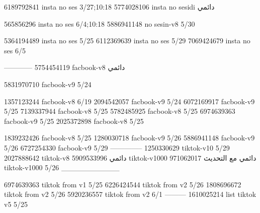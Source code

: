 
6189792841 insta no ses
3/27;10:18
5774028106 insta no sesidi
دائمي


565856296 insta no ses
6/4;10:18
5886941148 no sesin-v8
5/30

5364194489 insta no ses
5/25
6112369639 insta no ses
5/29
7069424679 insta no ses
6/5

------------
5754454119 facbook-v8
دائمي

5831970710 facbook-v9
5/24

1357123244 facbook-v8
6/19
2094542057 facbook-v9
5/24
6072169917 facbook-v9
5/25
7139337944 facbook-v8
5/25
5782485925 facbook-v8
5/25
6974639363 facbook-v9
5/25
2025372898 facbook-v8
5/25

1839232426 facbook-v8
5/25
1280030718 facbook-v9
5/26
5886941148 facbook-v9
5/26
6727254330 facbook-v9
5/29
--------------
1250330629 tiktok-v10
5/29
2027888642 tiktok-v8
دائمي
5909533996 tiktok-v1000
دائمي مع التحديث
971062017 tiktok-v1000
5/26
___________

6974639363 tiktok from v1
5/25
6226424544 tiktok from v2
5/26
1808696672 tiktok from v2
5/26
5920236557 tiktok from v2
6/1
---------
1610025214 list tiktok v5
5/25
